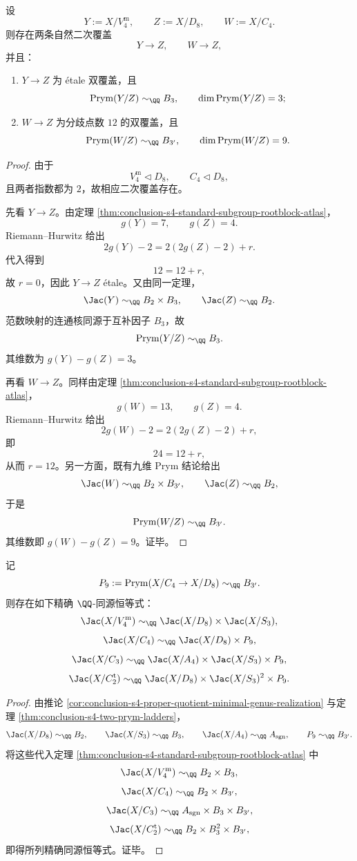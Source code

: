 \begin{theorem}\label{thm:conclusion-s4-two-prym-ladders}
设
\[
Y:=X/V_4^{\mathrm m},\qquad Z:=X/D_8,\qquad W:=X/C_4.
\]
则存在两条自然二次覆盖
\[
Y\longrightarrow Z,\qquad W\longrightarrow Z,
\]
并且：
\begin{enumerate}
  \item \(Y\to Z\) 为 \'{e}tale 双覆盖，且
  \[
  \operatorname{Prym}(Y/Z)\sim_{\QQ} B_3,\qquad \dim \operatorname{Prym}(Y/Z)=3;
  \]
  \item \(W\to Z\) 为分歧点数 \(12\) 的双覆盖，且
  \[
  \operatorname{Prym}(W/Z)\sim_{\QQ} B_{3'},\qquad \dim \operatorname{Prym}(W/Z)=9.
  \]
\end{enumerate}
\end{theorem}
\begin{proof}
由于
\[
V_4^{\mathrm m}\triangleleft D_8,\qquad C_4\triangleleft D_8,
\]
且两者指数都为 \(2\)，故相应二次覆盖存在。

先看 \(Y\to Z\)。由定理 \ref{thm:conclusion-s4-standard-subgroup-rootblock-atlas}，
\[
g(Y)=7,\qquad g(Z)=4.
\]
Riemann--Hurwitz 给出
\[
2g(Y)-2=2(2g(Z)-2)+r.
\]
代入得到
\[
12=12+r,
\]
故 \(r=0\)，因此 \(Y\to Z\) \'{e}tale。又由同一定理，
\[
\Jac(Y)\sim_{\QQ} B_2\times B_3,\qquad \Jac(Z)\sim_{\QQ} B_2.
\]
范数映射的连通核同源于互补因子 \(B_3\)，故
\[
\operatorname{Prym}(Y/Z)\sim_{\QQ} B_3.
\]
其维数为 \(g(Y)-g(Z)=3\)。

再看 \(W\to Z\)。同样由定理 \ref{thm:conclusion-s4-standard-subgroup-rootblock-atlas}，
\[
g(W)=13,\qquad g(Z)=4.
\]
Riemann--Hurwitz 给出
\[
2g(W)-2=2(2g(Z)-2)+r,
\]
即
\[
24=12+r,
\]
从而 \(r=12\)。另一方面，既有九维 Prym 结论给出
\[
\Jac(W)\sim_{\QQ} B_2\times B_{3'},\qquad \Jac(Z)\sim_{\QQ} B_2,
\]
于是
\[
\operatorname{Prym}(W/Z)\sim_{\QQ} B_{3'}.
\]
其维数即 \(g(W)-g(Z)=9\)。证毕。
\end{proof}

\begin{theorem}\label{thm:conclusion-s4-low-genus-exact-isogeny-identities}
记
\[
P_9:=\operatorname{Prym}(X/C_4\to X/D_8)\sim_{\QQ} B_{3'}.
\]
则存在如下精确 \(\QQ\)-同源恒等式：
\[
\Jac(X/V_4^{\mathrm m})
\sim_{\QQ}
\Jac(X/D_8)\times \Jac(X/S_3),
\]
\[
\Jac(X/C_4)
\sim_{\QQ}
\Jac(X/D_8)\times P_9,
\]
\[
\Jac(X/C_3)
\sim_{\QQ}
\Jac(X/A_4)\times \Jac(X/S_3)\times P_9,
\]
\[
\Jac(X/C_2^{\mathrm t})
\sim_{\QQ}
\Jac(X/D_8)\times \Jac(X/S_3)^{2}\times P_9.
\]
\end{theorem}
\begin{proof}
由推论 \ref{cor:conclusion-s4-proper-quotient-minimal-genus-realization} 与定理 \ref{thm:conclusion-s4-two-prym-ladders}，
\[
\Jac(X/D_8)\sim_{\QQ} B_2,\qquad
\Jac(X/S_3)\sim_{\QQ} B_3,\qquad
\Jac(X/A_4)\sim_{\QQ} A_{\mathrm{sgn}},\qquad
P_9\sim_{\QQ} B_{3'}.
\]
将这些代入定理 \ref{thm:conclusion-s4-standard-subgroup-rootblock-atlas} 中
\[
\Jac(X/V_4^{\mathrm m})\sim_{\QQ} B_2\times B_3,
\]
\[
\Jac(X/C_4)\sim_{\QQ} B_2\times B_{3'},
\]
\[
\Jac(X/C_3)\sim_{\QQ} A_{\mathrm{sgn}}\times B_3\times B_{3'},
\]
\[
\Jac(X/C_2^{\mathrm t})\sim_{\QQ} B_2\times B_3^{2}\times B_{3'},
\]
即得所列精确同源恒等式。证毕。
\end{proof}

